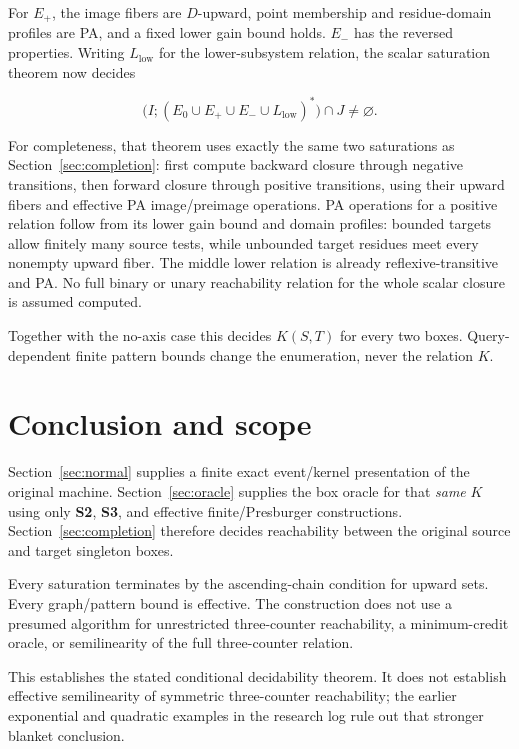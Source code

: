 \documentclass[11pt,a4paper]{article}
\theoremstyle{remark}
\begin{document}
For \(E_+\), the image fibers are \(D\)-upward, point membership and residue-domain profiles are PA, and a fixed lower gain bound holds. \(E_-\) has the reversed properties. Writing \(L_{\mathrm{low}}\) for the lower-subsystem relation, the scalar saturation theorem now decides

\begin{equation*}
\bigl(I;(E_0\cup E_+\cup E_-\cup L_{\mathrm{low}})^*\bigr)\cap J\neq\varnothing.
\end{equation*}


For completeness, that theorem uses exactly the same two saturations as Section~\ref{sec:completion}: first compute backward closure through negative transitions, then forward closure through positive transitions, using their upward fibers and effective PA image/preimage operations. PA operations for a positive relation follow from its lower gain bound and domain profiles: bounded targets allow finitely many source tests, while unbounded target residues meet every nonempty upward fiber. The middle lower relation is already reflexive-transitive and PA. No full binary or unary reachability relation for the whole scalar closure is assumed computed.

Together with the no-axis case this decides \(K(S,T)\) for every two boxes. Query-dependent finite pattern bounds change the enumeration, never the relation \(K\).

\section{Conclusion and scope}\label{sec:conclusion}

Section~\ref{sec:normal} supplies a finite exact event/kernel presentation of the original machine. Section~\ref{sec:oracle} supplies the box oracle for that \emph{same} \(K\) using only \textbf{S2}, \textbf{S3}, and effective finite/Presburger constructions. Section~\ref{sec:completion} therefore decides reachability between the original source and target singleton boxes.

Every saturation terminates by the ascending-chain condition for upward sets. Every graph/pattern bound is effective. The construction does not use a presumed algorithm for unrestricted three-counter reachability, a minimum-credit oracle, or semilinearity of the full three-counter relation.

This establishes the stated conditional decidability theorem. It does not establish effective semilinearity of symmetric three-counter reachability; the earlier exponential and quadratic examples in the research log rule out that stronger blanket conclusion.
\end{document}

